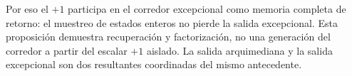 Por eso el \(+1\) participa en el corredor excepcional como memoria completa
de retorno: el muestreo de estados enteros no pierde la salida excepcional.
Esta proposición demuestra recuperación y factorización, no una generación
del corredor a partir del escalar \(+1\) aislado. La salida arquimediana y la
salida excepcional son dos resultantes coordinadas del mismo antecedente.
